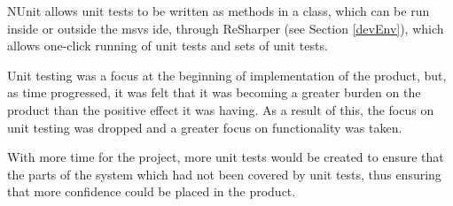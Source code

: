 NUnit allows unit tests to be written as methods in a class, which can be run inside or outside the \gls{msvs} \gls{ide}, through ReSharper (see Section \ref{devEnv}), which allows one-click running of unit tests and sets of unit tests.

Unit testing was a focus at the beginning of implementation of the product, but, as time progressed, it was felt that it was becoming a greater burden on the product than the positive effect it was having.  As a result of this, the focus on unit testing was dropped and a greater focus on functionality was taken.

With more time for the project, more unit tests would be created to ensure that the parts of the system which had not been covered by unit tests, thus ensuring that more confidence could be placed in the product.

